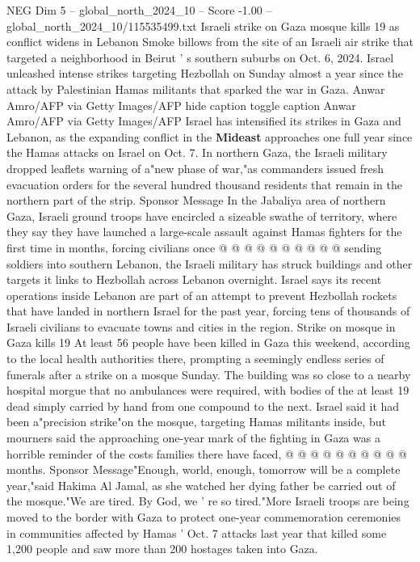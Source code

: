 \begin{textsample}{NEG Dim 5 – global\_north\_2024\_10 – Score -1.00 – global\_north\_2024\_10/115535499.txt}  \label{ex:f5_neg_053}
Israeli strike on Gaza mosque kills 19 as conflict widens in Lebanon Smoke billows from the site of an Israeli air strike that targeted a neighborhood in Beirut ' s southern suburbs on Oct. 6, 2024.
Israel unleashed intense strikes targeting Hezbollah on Sunday almost a year since the attack by Palestinian Hamas militants that sparked the war in Gaza.
Anwar Amro/AFP via Getty Images/AFP hide caption toggle caption Anwar Amro/AFP via Getty Images/AFP Israel has intensified its strikes in Gaza and Lebanon, as the expanding conflict in the \textbf{Mideast} approaches one full year since the Hamas attacks on Israel on Oct. 7.
In northern Gaza, the Israeli military dropped leaflets warning of a"new phase of war,"as commanders issued fresh evacuation orders for the several hundred thousand residents that remain in the northern part of the strip.
Sponsor Message In the Jabaliya area of northern Gaza, Israeli ground troops have encircled a sizeable swathe of territory, where they say they have launched a large-scale assault against Hamas fighters for the first time in months, forcing civilians once @ @ @ @ @ @ @ @ @ @ sending soldiers into southern Lebanon, the Israeli military has struck buildings and other targets it links to Hezbollah across Lebanon overnight.
Israel says its recent operations inside Lebanon are part of an attempt to prevent Hezbollah rockets that have landed in northern Israel for the past year, forcing tens of thousands of Israeli civilians to evacuate towns and cities in the region.
Strike on mosque in Gaza kills 19 At least 56 people have been killed in Gaza this weekend, according to the local health authorities there, prompting a seemingly endless series of funerals after a strike on a mosque Sunday.
The building was so close to a nearby hospital morgue that no ambulances were required, with bodies of the at least 19 dead simply carried by hand from one compound to the next.
Israel said it had been a"precision strike"on the mosque, targeting Hamas militants inside, but mourners said the approaching one-year mark of the fighting in Gaza was a horrible reminder of the costs families there have faced, @ @ @ @ @ @ @ @ @ @ months.
Sponsor Message"Enough, world, enough, tomorrow will be a complete year,"said Hakima Al Jamal, as she watched her dying father be carried out of the mosque."We are tired.
By God, we ' re so tired."More Israeli troops are being moved to the border with Gaza to protect one-year commemoration ceremonies in communities affected by Hamas ' Oct. 7 attacks last year that killed some 1,200 people and saw more than 200 hostages taken into Gaza.

\end{textsample}
